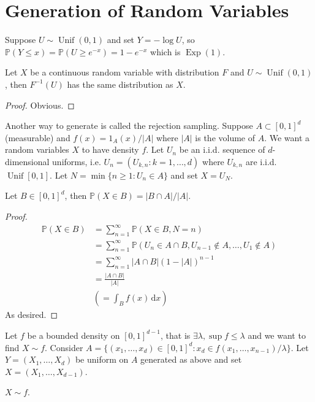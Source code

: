 \section{Generation of Random Variables}
\begin{example}
    Suppose $U\sim\operatorname{Unif}(0,1)$ and set $Y=-\log U$, so $\mathbb P(Y\le x)=\mathbb P(U\ge e^{-x})=1-e^{-x}$ which is $\operatorname{Exp}(1)$.
\end{example}
\begin{theorem}
    Let $X$ be a continuous random variable with distribution $F$ and $U\sim\operatorname{Unif}(0,1)$, then $F^{-1}(U)$ has the same distribution as $X$.
\end{theorem}
\begin{proof}
    Obvious.
\end{proof}
Another way to generate is called the rejection sampling.
Suppose $A\subset [0,1]^d$ (measurable) and $f(x)=1_{A}(x)/|A|$ where $|A|$ is the volume of $A$.
We want a random variables $X$ to have density $f$.
Let $U_n$ be an i.i.d. sequence of $d$-dimensional uniforms, i.e. $U_n=(U_{k,n}:k=1,\ldots,d)$ where $U_{k,n}$ are i.i.d. $\operatorname{Unif}[0,1]$.
Let $N=\min\{n\ge 1:U_n\in A\}$ and set $X=U_N$.
\begin{proposition}
    Let $B\in[0,1]^d$, then $\mathbb P(X\in B)=|B\cap A|/|A|$.
\end{proposition}
\begin{proof}
    \begin{align*}
        \mathbb P(X\in B)&=\sum_{n=1}^\infty\mathbb P(X\in B,N=n)\\
        &=\sum_{n=1}^\infty\mathbb P(U_n\in A\cap B,U_{n-1}\notin A,\ldots,U_1\notin A)\\
        &=\sum_{n=1}^\infty |A\cap B|(1-|A|)^{n-1}\\
        &=\frac{|A\cap B|}{|A|}\\
        &\left(=\int_Bf(x)\,\mathrm dx\right)
    \end{align*}
    As desired.
\end{proof}
Let $f$ be a bounded density on $[0,1]^{d-1}$, that is $\exists\lambda,\sup f\le\lambda$ and we want to find $X\sim f$.
Consider $A=\{(x_1,\ldots,x_d)\in [0,1]^d:x_d\in f(x_1,\ldots,x_{n-1})/\lambda\}$.
Let $Y=(X_1,\ldots,X_d)$ be uniform on $A$ generated as above and set $X=(X_1,\ldots,X_{d-1})$.
\begin{proposition}
    $X\sim f$.
\end{proposition}
